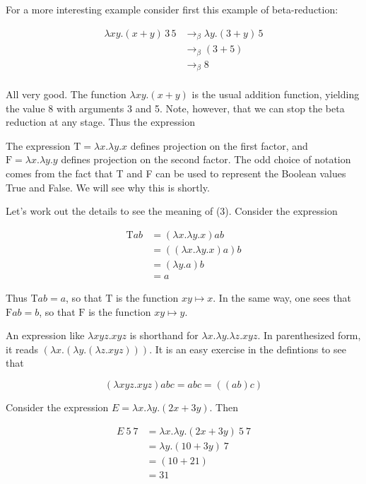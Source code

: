 For a more interesting example consider first this example of beta-reduction:

\begin{align}
  \lambda x y.(x + y)\, 3\, 5 &\to_\beta \lambda y.(3 + y)\, 5 \\
      &\to_\beta (3 + 5) \\
    &\to_\beta 8 \\
\end{align}

All very good.  The function $\lambda xy.(x+y)$ is the usual addition function, yielding the value 8 with arguments 3 and 5.  Note, however, that we can stop the beta reduction at any stage.  Thus the expression

The expression $\text{T} = \lambda x.\lambda y . x$ defines projection on the first factor, and $\text{F} = \lambda x.\lambda y . y$ defines projection on the second factor.  The odd choice of notation comes from the fact that T and F can be used to represent the Boolean values True and False.  We will see why this is shortly.





Let's work out the details to see the meaning of (3).  Consider the expression

\begin{align}
 \text{T}ab &= (\lambda x.\lambda y . x)ab \\
 &= ((\lambda x.\lambda y . x)a)b  \\
&= (\lambda y.a) b \\
&= a
\end{align}

Thus $ \text{T}ab = a$, so that $ \text{T}$ is the function $xy \mapsto x$.  In the same way, one sees that $ \text{F}ab = b$, so that $ \text{F}$ is the function $xy \mapsto y$.


An expression like $\lambda xyz.xyz$ is shorthand for $\lambda x. \lambda y. \lambda z. xyz$.  In parenthesized form, it reads $(\lambda x.(\lambda y.(\lambda z.xyz)))$. It is an easy exercise in the defintions to see that

\begin{equation}
  (\lambda xyz .xyz) abc = abc = ((ab)c)
\end{equation}


Consider the expression $E = \lambda x. \lambda y. (2x + 3y)$. Then

\begin{align}
 E\ 5\ 7 &= \lambda x. \lambda y. (2x + 3y)\ 5\ 7\\
  &= \lambda y . (10 + 3y)\ 7 \\
  &= (10 + 21) \\
  &= 31 \\
\end{align}

